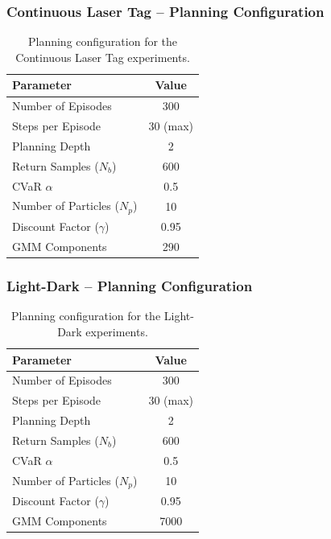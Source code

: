 \documentclass[acmlarge, manuscript, screen, review, natbib=false, oneside]{acmart}
\begin{document}
\subsubsection{Continuous Laser Tag -- Planning Configuration}

\begin{table}[ht]
	\centering
	\small
	\setlength{\tabcolsep}{4pt}
	\begin{tabular}{|l|c|}
		\hline
		\textbf{Parameter} & \textbf{Value} \\
		\hline
		Number of Episodes & 300 \\
		\hline
		Steps per Episode & 30 (max) \\
		\hline
		Planning Depth & 2 \\
		\hline
		Return Samples ($N_b$) & 600 \\
		\hline
		CVaR $\alpha$ & 0.5 \\
		\hline
		Number of Particles ($N_p$) & 10 \\
		\hline
		Discount Factor ($\gamma$) & 0.95 \\
		\hline
		GMM Components & 290 \\
		\hline
	\end{tabular}
	\caption{Planning configuration for the Continuous Laser Tag experiments.}
	\label{tab:laser_tag_config}
\end{table}

\subsubsection{Light-Dark -- Planning Configuration}

\begin{table}[ht]
	\centering
	\small
	\setlength{\tabcolsep}{4pt}
	\begin{tabular}{|l|c|}
		\hline
		\textbf{Parameter} & \textbf{Value} \\
		\hline
		Number of Episodes & 300 \\
		\hline
		Steps per Episode & 30 (max) \\
		\hline
		Planning Depth & 2 \\
		\hline
		Return Samples ($N_b$) & 600 \\
		\hline
		CVaR $\alpha$ & 0.5 \\
		\hline
		Number of Particles ($N_p$) & 10 \\
		\hline
		Discount Factor ($\gamma$) & 0.95 \\
		\hline
		GMM Components & 7000 \\
		\hline
	\end{tabular}
	\caption{Planning configuration for the Light-Dark experiments.}
	\label{tab:light_dark_config}
\end{table}
\end{document}
